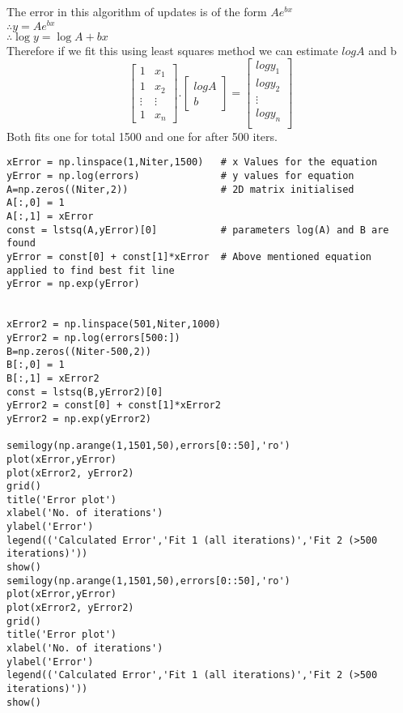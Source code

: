 \documentclass[11pt]{article}
\begin{document}
The error in this algorithm of updates is of the form \(Ae^{bx}\)\\
\(\therefore y=Ae^{bx}\) \\\(\therefore \log{y}=\log{A}+bx\) \\Therefore if
we fit this using least squares method we can estimate \(log{A}\) and b
\begin{equation}
\begin{bmatrix}
    1       & x_{1}  \\
    1       & x_{2}  \\
    \vdots  & \vdots \\
    1       & x_{n} 
\end{bmatrix}
.
\begin{bmatrix}
    log{A}\\
    b
\end{bmatrix}
 =
\begin{bmatrix}
    log{y_{1}}\\
    log{y_{2}}\\
    \vdots    \\
    log{y_{n}}\\
\end{bmatrix} 
\end{equation}
Both fits one for total 1500 and one for after 500 iters.
\begin{Verbatim}
xError = np.linspace(1,Niter,1500)   # x Values for the equation
yError = np.log(errors)              # y values for equation
A=np.zeros((Niter,2))                # 2D matrix initialised
A[:,0] = 1
A[:,1] = xError
const = lstsq(A,yError)[0]           # parameters log(A) and B are found
yError = const[0] + const[1]*xError  # Above mentioned equation applied to find best fit line
yError = np.exp(yError)


xError2 = np.linspace(501,Niter,1000)
yError2 = np.log(errors[500:])
B=np.zeros((Niter-500,2))
B[:,0] = 1
B[:,1] = xError2
const = lstsq(B,yError2)[0]
yError2 = const[0] + const[1]*xError2
yError2 = np.exp(yError2)

semilogy(np.arange(1,1501,50),errors[0::50],'ro')
plot(xError,yError)
plot(xError2, yError2)
grid()
title('Error plot')
xlabel('No. of iterations')
ylabel('Error')
legend(('Calculated Error','Fit 1 (all iterations)','Fit 2 (>500 iterations)'))
show()
semilogy(np.arange(1,1501,50),errors[0::50],'ro')
plot(xError,yError)
plot(xError2, yError2)
grid()
title('Error plot')
xlabel('No. of iterations')
ylabel('Error')
legend(('Calculated Error','Fit 1 (all iterations)','Fit 2 (>500 iterations)'))
show()
\end{Verbatim}
\end{document}
